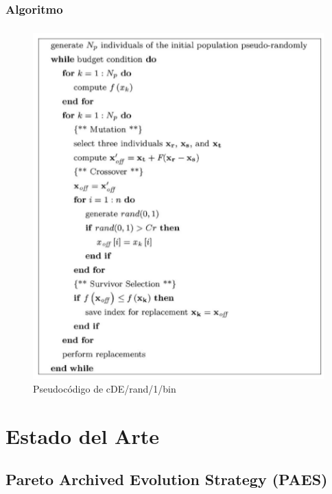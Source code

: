 \documentclass[serif]{beamer}
\begin{document}
\subsubsection{Algoritmo}
\begin{frame}
\frametitle{\insertsubsection}
	\vspace*{-0.2cm}
	\begin{figure}
	\centering
	\includegraphics[height=0.9\textheight]{cde_algorithm.png}
	\caption{Pseudocódigo de cDE/rand/1/bin}
	\end{figure}
\end{frame}

\section{Estado del Arte}

\subsection{Pareto Archived Evolution Strategy (PAES)}
\end{document}
